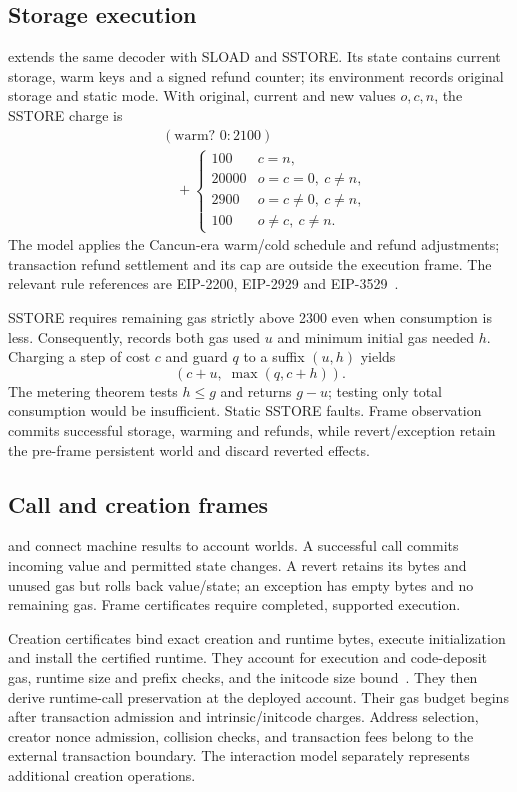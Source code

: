 \documentclass[conference]{IEEEtran}
\begin{document}
\subsection{Storage execution}
 extends the same decoder with SLOAD and SSTORE.
Its state contains current storage, warm keys and a signed refund counter;
its environment records original storage and static mode. With original,
current and new values $o,c,n$, the SSTORE charge is
\begin{align*}
 &(\text{warm? }0:2100)\\
 &\quad+\begin{cases}
 100&c=n,\\
 20000&o=c=0,\ c\ne n,\\
 2900&o=c\ne0,\ c\ne n,\\
 100&o\ne c,\ c\ne n.
 \end{cases}
\end{align*}
The model applies the Cancun-era warm/cold schedule and refund adjustments;
transaction refund settlement and its cap are outside the execution frame.
The relevant rule references are EIP-2200, EIP-2929 and EIP-3529~\cite{eip2200,eip2929,eip3529}.

SSTORE requires remaining gas strictly above 2300 even when consumption is
less. Consequently,  records both gas used $u$
and minimum initial gas needed $h$. Charging a step of cost $c$ and guard $q$
to a suffix $(u,h)$ yields
\[
 (c+u,\;\max(q,c+h)).
\]
The metering theorem tests $h\leq g$ and returns $g-u$; testing only total
consumption would be insufficient. Static SSTORE faults. Frame observation
commits successful storage, warming and refunds, while revert/exception retain
the pre-frame persistent world and discard reverted effects.

\subsection{Call and creation frames}
 and 
connect machine results to account worlds. A successful call commits incoming
value and permitted state changes. A revert retains its bytes and unused gas
but rolls back value/state; an exception has empty bytes and no remaining gas.
Frame certificates require completed, supported execution.

Creation certificates bind exact creation and runtime bytes, execute
initialization and install the certified runtime. They account for execution
and code-deposit gas, runtime size and prefix checks, and the initcode size
bound~\cite{eip170,eip3541,eip3860}. They then derive runtime-call preservation
at the deployed account. Their gas budget begins after transaction admission
and intrinsic/initcode charges. Address selection, creator nonce admission,
collision checks, and transaction fees belong to the external transaction
boundary. The interaction model separately represents additional creation
operations.
\end{document}
